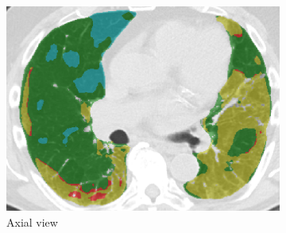 \begin{figure}[htbp] 
\centering
\begin{subfigure}{.45\linewidth}%
  \includegraphics[width=\linewidth,trim={{.0\wd0} {.0\wd0} {.0\wd0} {.0\wd0}},clip]{QuantitativeAnalysis/Image/IP305RegionLabel_Axial.png} %
  \caption{Axial view}
  \label{fig:CALIPERTissueClassification-a} 
\end{subfigure} 
\hspace{.3in}
\begin{subfigure}{.33\linewidth}%

\end{subfigure}
\end{figure}
